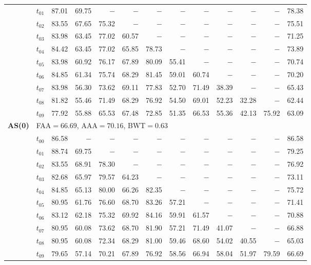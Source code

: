 \begin{table}[ht]
\begin{tabular}{@{}l l r r r r r r r r r r r@{}}
 & $t_{01}$ & 87.01 & 69.75 & $-$ & $-$ & $-$ & $-$ & $-$ & $-$ & $-$ & $-$ & 78.38 \\
 & $t_{02}$ & 83.55 & 67.65 & 75.32 & $-$ & $-$ & $-$ & $-$ & $-$ & $-$ & $-$ & 75.51 \\
 & $t_{03}$ & 83.98 & 63.45 & 77.02 & 60.57 & $-$ & $-$ & $-$ & $-$ & $-$ & $-$ & 71.25 \\
 & $t_{04}$ & 84.42 & 63.45 & 77.02 & 65.85 & 78.73 & $-$ & $-$ & $-$ & $-$ & $-$ & 73.89 \\
 & $t_{05}$ & 83.98 & 60.92 & 76.17 & 67.89 & 80.09 & 55.41 & $-$ & $-$ & $-$ & $-$ & 70.74 \\
 & $t_{06}$ & 84.85 & 61.34 & 75.74 & 68.29 & 81.45 & 59.01 & 60.74 & $-$ & $-$ & $-$ & 70.20 \\
 & $t_{07}$ & 83.98 & 56.30 & 73.62 & 69.11 & 77.83 & 52.70 & 71.49 & 38.39 & $-$ & $-$ & 65.43 \\
 & $t_{08}$ & 81.82 & 55.46 & 71.49 & 68.29 & 76.92 & 54.50 & 69.01 & 52.23 & 32.28 & $-$ & 62.44 \\
 & $t_{09}$ & 77.92 & 55.88 & 65.53 & 67.48 & 72.85 & 51.35 & 66.53 & 55.36 & 42.13 & 75.92 & 63.09 \\
\midrule
\multirow{11}{*}{\textbf{AS(0)}} & \multicolumn{12}{l}{\quad\small FAA$=66.69$,\; AAA$=70.16$,\; BWT$=0.63$} \\
 & $t_{00}$ & 86.58 & $-$ & $-$ & $-$ & $-$ & $-$ & $-$ & $-$ & $-$ & $-$ & 86.58 \\
 & $t_{01}$ & 88.74 & 69.75 & $-$ & $-$ & $-$ & $-$ & $-$ & $-$ & $-$ & $-$ & 79.25 \\
 & $t_{02}$ & 83.55 & 68.91 & 78.30 & $-$ & $-$ & $-$ & $-$ & $-$ & $-$ & $-$ & 76.92 \\
 & $t_{03}$ & 82.68 & 65.97 & 79.57 & 64.23 & $-$ & $-$ & $-$ & $-$ & $-$ & $-$ & 73.11 \\
 & $t_{04}$ & 84.85 & 65.13 & 80.00 & 66.26 & 82.35 & $-$ & $-$ & $-$ & $-$ & $-$ & 75.72 \\
 & $t_{05}$ & 80.95 & 61.76 & 76.60 & 68.70 & 83.26 & 57.21 & $-$ & $-$ & $-$ & $-$ & 71.41 \\
 & $t_{06}$ & 83.12 & 62.18 & 75.32 & 69.92 & 84.16 & 59.91 & 61.57 & $-$ & $-$ & $-$ & 70.88 \\
 & $t_{07}$ & 80.95 & 60.08 & 73.62 & 68.70 & 81.90 & 57.21 & 71.49 & 41.07 & $-$ & $-$ & 66.88 \\
 & $t_{08}$ & 80.95 & 60.08 & 72.34 & 68.29 & 81.00 & 59.46 & 68.60 & 54.02 & 40.55 & $-$ & 65.03 \\
 & $t_{09}$ & 79.65 & 57.14 & 70.21 & 67.89 & 76.92 & 58.56 & 66.94 & 58.04 & 51.97 & 79.59 & 66.69 \\

\end{tabular}
\end{table}
